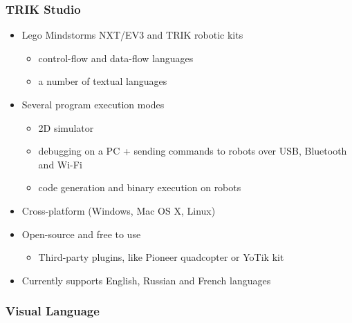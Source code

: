 \documentclass[xetex,mathserif,serif]{beamer}
\begin{document}
	\begin{frame}
		\frametitle{TRIK Studio}
		\begin{itemize}
			\item Lego Mindstorms NXT/EV3 and TRIK robotic kits
			\begin{itemize}
				\item control-flow and data-flow languages
				\item a number of textual languages
			\end{itemize}
			\item Several program execution modes
			\begin{itemize}
				\item 2D simulator
				\item debugging on a PC + sending commands to robots over USB, Bluetooth and Wi-Fi
				\item code generation and binary execution on robots
			\end{itemize}
			\item Cross-platform (Windows, Mac OS X, Linux)
			\item Open-source and free to use
			\begin{itemize}
				\item Third-party plugins, like Pioneer quadcopter or YoTik kit
			\end{itemize}
			\item Currently supports English, Russian and French languages
		\end{itemize}
	\end{frame}

	\begin{frame}
		\frametitle{Visual Language}
	\end{frame}
\end{document}
